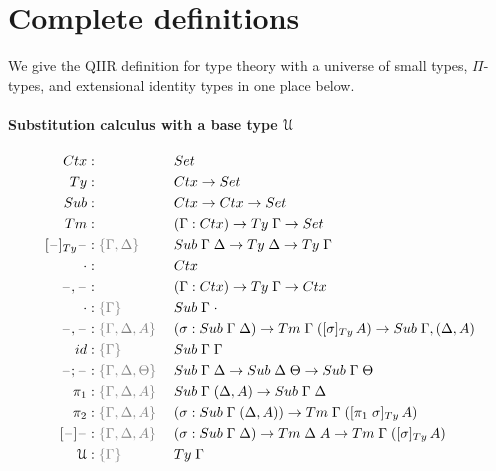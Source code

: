 \documentclass[a4paper,UKenglish,numberwithinsect,cleveref,thm-restate]{lipics-v2021}
\begin{document}


\appendix

\section{Complete definitions}
We give the QIIR definition for type theory with a universe of small types, $\Pi$-types, and extensional identity types in one place below.

\paragraph*{Substitution calculus with a base type $\mathcal{U}$}
\begin{alignat*}{3}
  \Ctx      & : && \Set                   \\
  \Ty       & : && \Ctx \to \Set          \\
  \Sub      & : && \Ctx \to \Ctx \to \Set \\
  \Tm       & : && (\Gamma : \Ctx) \to \Ty\;\Gamma \to \Set \\
  [\blank]_{\Ty}\blank & : \implicit{\Gamma, \Delta}\; && \Sub\;\Gamma\;\Delta \to \Ty\;\Delta \to \Ty\;\Gamma \\
  \emptyctx & : && \Ctx \\
  \blank,\blank & : && (\Gamma : \Ctx) \to \Ty\;\Gamma \to \Ctx \\
  \emptysub & : \implicit{\Gamma} && \Sub\;\Gamma\;\emptyctx \\
  \blank,\blank & : \implicit{\Gamma, \Delta, A} && (\sigma : \Sub\;\Gamma\;\Delta) \to \Tm\;\Gamma\;([ \sigma ]_{\Ty}\,A) \to \Sub\;\Gamma,(\Delta, A) \\
  \idS & : \implicit{\Gamma} && \Sub\;\Gamma\;\Gamma \\
  \blank;\blank & : \implicit{\Gamma, \Delta, \Theta} && \Sub\;\Gamma\;\Delta \to \Sub\;\Delta\;\Theta \to \Sub\;\Gamma\;\Theta \\
  \pi_1 & : \implicit{\Gamma, \Delta, A}\; && \Sub\;\Gamma\;(\Delta, A) \to \Sub\;\Gamma\;\Delta \\
  \pi_2 & : \implicit{\Gamma, \Delta, A}\; && (\sigma : \Sub\;\Gamma\;(\Delta, A)) \to \Tm\;\Gamma\;([ \pi_1\;\sigma ]_{\Ty}\, A) \\
  [\blank] \blank & : \implicit{\Gamma,\Delta, A} && (\sigma : \Sub\;\Gamma\;\Delta) \to \Tm\;\Delta\;A \to \Tm\;\Gamma\;([\sigma]_{\Ty}\, A) \\
  \UU     & : \implicit{\Gamma}\; && \Ty\; \Gamma
\end{alignat*}
\end{document}
